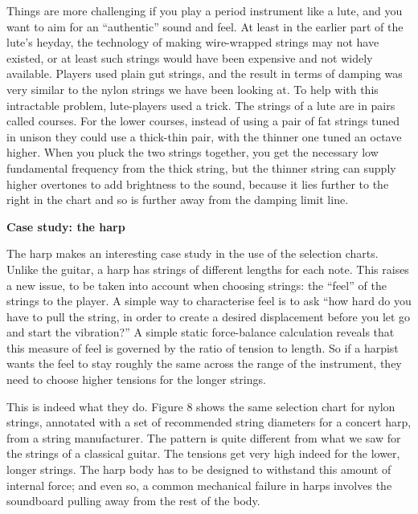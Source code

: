   Things are more challenging if you play a period instrument like a lute, and 
  you want to aim for an ``authentic'' sound and feel. At least in the earlier 
  part of the lute's heyday, the technology of making wire-wrapped strings may 
  not have existed, or at least such strings would have been expensive and not 
  widely available. Players used plain gut strings, and the result in terms of 
  damping was very similar to the nylon strings we have been looking at. To 
  help with this intractable problem, lute-players used a trick. The strings of 
  a lute are in pairs called courses. For the lower courses, instead of using a 
  pair of fat strings tuned in unison they could use a thick-thin pair, with 
  the thinner one tuned an octave higher. When you pluck the two strings 
  together, you get the necessary low fundamental frequency from the thick 
  string, but the thinner string can supply higher overtones to add brightness 
  to the sound, because it lies further to the right in the chart and so is 
  further away from the damping limit line. 

  \textbf{Case study: the harp} 

  The harp makes an interesting case study in the use of the selection charts. 
  Unlike the guitar, a harp has strings of different lengths for each note. 
  This raises a new issue, to be taken into account when choosing strings: the 
  ``feel'' of the strings to the player. A simple way to characterise feel is 
  to ask ``how hard do you have to pull the string, in order to create a 
  desired displacement before you let go and start the vibration?'' A simple 
  static force-balance calculation reveals that this measure of feel is 
  governed by the ratio of tension to length. So if a harpist wants the feel to 
  stay roughly the same across the range of the instrument, they need to choose 
  higher tensions for the longer strings. 

  This is indeed what they do. Figure 8 shows the same selection chart for 
  nylon strings, annotated with a set of recommended string diameters for a 
  concert harp, from a string manufacturer. The pattern is quite different from 
  what we saw for the strings of a classical guitar. The tensions get very high 
  indeed for the lower, longer strings. The harp body has to be designed to 
  withstand this amount of internal force; and even so, a common mechanical 
  failure in harps involves the soundboard pulling away from the rest of the 
  body. 


